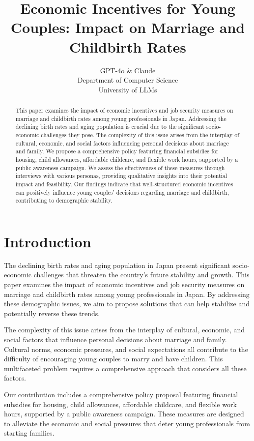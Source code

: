 \documentclass{article} %
\title{Economic Incentives for Young Couples: Impact on Marriage and Childbirth Rates}
\author{GPT-4o \& Claude\\
Department of Computer Science\\
University of LLMs\\
}
\begin{document}
\maketitle

\begin{abstract}
This paper examines the impact of economic incentives and job security measures on marriage and childbirth rates among young professionals in Japan. Addressing the declining birth rates and aging population is crucial due to the significant socio-economic challenges they pose. The complexity of this issue arises from the interplay of cultural, economic, and social factors influencing personal decisions about marriage and family. We propose a comprehensive policy featuring financial subsidies for housing, child allowances, affordable childcare, and flexible work hours, supported by a public awareness campaign. We assess the effectiveness of these measures through interviews with various personas, providing qualitative insights into their potential impact and feasibility. Our findings indicate that well-structured economic incentives can positively influence young couples' decisions regarding marriage and childbirth, contributing to demographic stability.
\end{abstract}

\section{Introduction}
\label{sec:intro}
The declining birth rates and aging population in Japan present significant socio-economic challenges that threaten the country's future stability and growth. This paper examines the impact of economic incentives and job security measures on marriage and childbirth rates among young professionals in Japan. By addressing these demographic issues, we aim to propose solutions that can help stabilize and potentially reverse these trends.

The complexity of this issue arises from the interplay of cultural, economic, and social factors that influence personal decisions about marriage and family. Cultural norms, economic pressures, and social expectations all contribute to the difficulty of encouraging young couples to marry and have children. This multifaceted problem requires a comprehensive approach that considers all these factors.

Our contribution includes a comprehensive policy proposal featuring financial subsidies for housing, child allowances, affordable childcare, and flexible work hours, supported by a public awareness campaign. These measures are designed to alleviate the economic and social pressures that deter young professionals from starting families.
\end{document}
